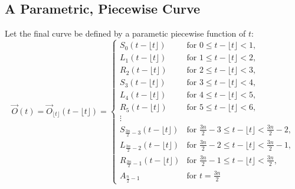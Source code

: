 \documentclass{article}
\begin{document}
\subsection{A Parametric, Piecewise Curve}
Let the final curve be defined by a parametic piecewise function of $t$:
\[
\overrightarrow{O}(t) = \overrightarrow{O}_{\lfloor t \rfloor}(t - \lfloor t \rfloor) = \begin{cases}
S_0(t - \lfloor t \rfloor) & \text{for } 0 \leq t - \lfloor t \rfloor < 1, \\
L_1(t - \lfloor t \rfloor) & \text{for } 1 \leq t - \lfloor t \rfloor < 2, \\
R_2(t - \lfloor t \rfloor) & \text{for } 2 \leq t - \lfloor t \rfloor < 3, \\
S_3(t - \lfloor t \rfloor) & \text{for } 3 \leq t - \lfloor t \rfloor < 4, \\
L_4(t - \lfloor t \rfloor) & \text{for } 4 \leq t - \lfloor t \rfloor < 5, \\
R_5(t - \lfloor t \rfloor) & \text{for } 5 \leq t - \lfloor t \rfloor < 6, \\
\vdots & \\
S_{\frac{3n}{2}-3}(t - \lfloor t \rfloor) & \text{for } \frac{3n}{2}-3 \leq t - \lfloor t \rfloor < \frac{3n}{2}-2, \\
L_{\frac{3n}{2}-2}(t - \lfloor t \rfloor) & \text{for } \frac{3n}{2}-2 \leq t - \lfloor t \rfloor < \frac{3n}{2}-1, \\
R_{\frac{3n}{2}-1}(t - \lfloor t \rfloor) & \text{for } \frac{3n}{2}-1 \leq t - \lfloor t \rfloor < \frac{3n}{2}, \\
A_{\frac{n}{2}-1} & \text{for } t = \frac{3n}{2}
\end{cases}
\]
\end{document}
